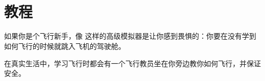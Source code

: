 
\ifchinese
\chapter{{\\}教程}
\fi
\iffalse
\IfLanguageName{english}{
\chapter{Tutorials}
}{}
\fi
{}
\label{tutorials}

\ifchinese
如果你是个飞行新手，像 \FlightGear{} 这样的高级模拟器是让你感到畏惧的：你要在没有学到如何飞行的时候就跳入飞机的驾驶舱。

在真实生活中，学习飞行时都会有一个飞行教员坐在你旁边教你如何飞行，并保证安全。

